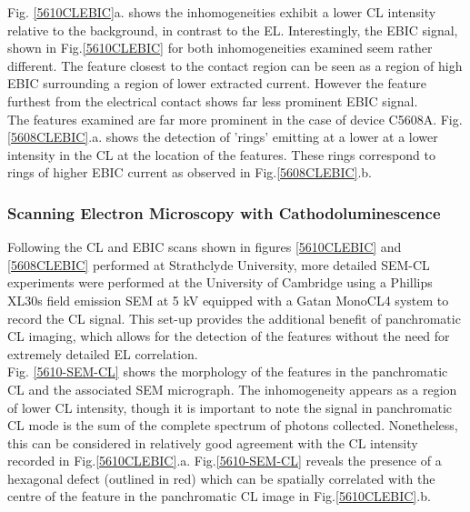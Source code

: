 Fig. \ref{5610CLEBIC}a. shows the inhomogeneities exhibit a lower CL intensity relative to the background, in contrast to the EL. Interestingly, the EBIC signal, shown in Fig.\ref{5610CLEBIC} for both inhomogeneities examined seem rather different. The feature closest to the contact region can be seen as a region of high EBIC surrounding a region of lower extracted current. However the feature furthest from the electrical contact shows far less prominent EBIC signal.\\
The features examined are far more prominent in the case of device C5608A. Fig.\ref{5608CLEBIC}.a. shows the detection of 'rings' emitting at a lower at a lower intensity in the CL at the location of the features. These rings correspond to rings of higher EBIC current as observed in Fig.\ref{5608CLEBIC}.b.

\subsubsection{Scanning Electron Microscopy with Cathodoluminescence}
Following the CL and EBIC scans shown in figures \ref{5610CLEBIC} and \ref{5608CLEBIC} performed at Strathclyde University, more detailed SEM-CL experiments were performed at the University of Cambridge using a Phillips XL30s field emission SEM at 5 kV equipped with a Gatan MonoCL4 system to record the CL signal. This set-up provides the additional benefit of panchromatic CL imaging, which allows for the detection of the features without the need for extremely detailed EL correlation.\\
Fig. \ref{5610-SEM-CL} shows the morphology of the features in the panchromatic CL and the associated SEM micrograph. The inhomogeneity appears as a region of lower CL intensity, though it is important to note the signal in panchromatic CL mode is the sum of the complete spectrum of photons collected. Nonetheless, this can be considered in relatively good agreement with the CL intensity recorded in Fig.\ref{5610CLEBIC}.a. Fig.\ref{5610-SEM-CL} reveals the presence of a hexagonal defect (outlined in red) which can be spatially correlated with the centre of the feature in the panchromatic CL image in Fig.\ref{5610CLEBIC}.b.

